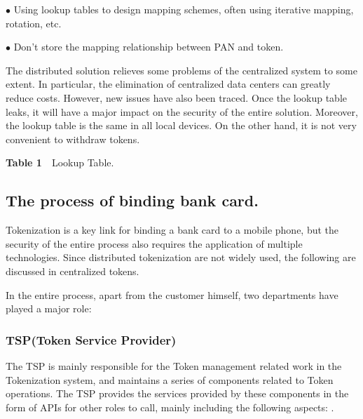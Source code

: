 \documentclass[journal]{IEEEtran}
\begin{document}
$ \bullet $ Using lookup tables to design mapping schemes, often using iterative mapping, rotation, etc.

$ \bullet $ Don't store the mapping relationship between PAN and token. 

The distributed solution relieves some problems of the centralized system to some extent. In particular, the elimination of centralized data centers can greatly reduce costs. However, new issues have also been traced. Once the lookup table leaks, it will have a major impact on the security of the entire solution. Moreover, the lookup table is the same in all local devices. On the other hand, it is not very convenient to withdraw tokens.



\begin{center}
\textbf{Table 1}~~Lookup Table.\\
\end{center}






\subsection{The process of binding bank card.}
Tokenization is a key link for binding a bank card to a mobile phone, but the security of the entire process also requires the application of multiple technologies. Since distributed tokenization are not widely used, the following are discussed in centralized tokens.

In the entire process, apart from the customer himself, two departments have played a major role:

\subsubsection{TSP(Token Service Provider)} The TSP is mainly responsible for the Token management related work in the Tokenization system, and maintains a series of components related to Token operations. The TSP provides the services provided by these components in the form of APIs for other roles to call, mainly including the following aspects: .
\end{document}

